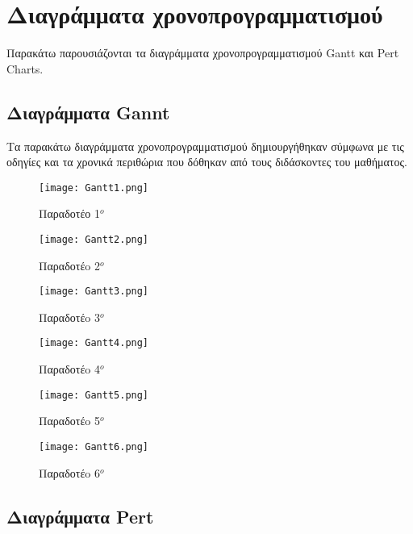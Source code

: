 \documentclass{article}
\begin{document}
\section{Διαγράμματα χρονοπρογραμματισμού}

Παρακάτω παρουσιάζονται τα διαγράμματα χρονοπρογραμματισμού Gantt και Pert Charts.

\subsection{Διαγράμματα Gannt}

Τα παρακάτω διαγράμματα χρονοπρογραμματισμού δημιουργήθηκαν σύμφωνα με τις οδηγίες και τα χρονικά περιθώρια που δόθηκαν από τους διδάσκοντες του μαθήματος.

\vspace{0.3cm}

\begin{figure}[!htb]
\centering
\texttt{[image: Gantt1.png]}
\caption{\label{fig:Gantt1} Παραδοτέο 1$^o$}
\end{figure}

\newpage
 
\begin{figure}[!htb]
\centering
\texttt{[image: Gantt2.png]}
\caption{\label{fig:Gantt2} Παραδοτέo 2$^o$}
\end{figure}

\begin{figure}[!htb]
\centering
\texttt{[image: Gantt3.png]}
\caption{\label{fig:Gannt3} Παραδοτέo 3$^o$}
\end{figure}

\begin{figure}[!htb]
\centering
\texttt{[image: Gantt4.png]}
\caption{\label{fig:Gannt4} Παραδοτέo 4$^o$}
\end{figure}

\newpage

\begin{figure}[!htb]
\centering
\texttt{[image: Gantt5.png]}
\caption{\label{fig:Gannt5} Παραδοτέo 5$^o$}
\end{figure}

\begin{figure}[!htb]
\centering
\texttt{[image: Gantt6.png]}
\caption{\label{fig:Gannt6} Παραδοτέo 6$^o$}
\end{figure}


\subsection{Διαγράμματα Pert}
\end{document}
